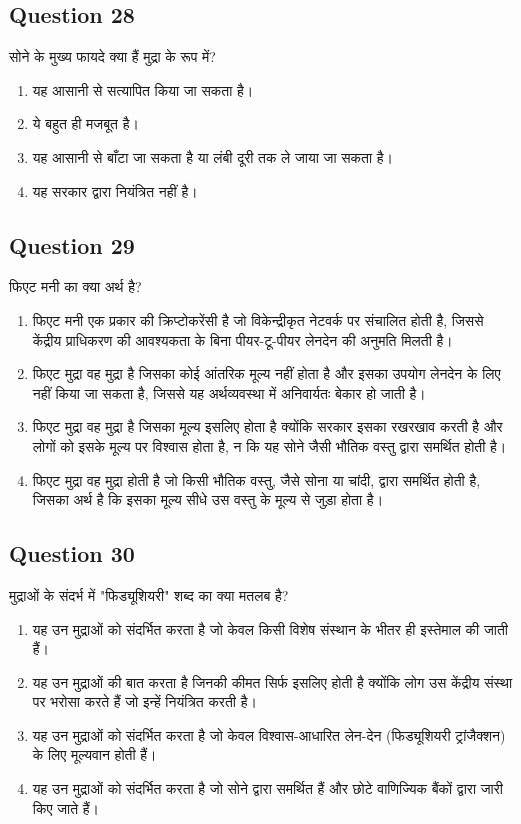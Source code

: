 \documentclass[12pt,a4paper]{article}
\begin{document}
\bigskip


\subsection*{Question 28}
सोने के मुख्य फायदे क्या हैं मुद्रा के रूप में?

\begin{enumerate}[label=\Alph*., leftmargin=*]
\item यह आसानी से सत्यापित किया जा सकता है।
\item ये बहुत ही मजबूत है।
\item यह आसानी से बाँटा जा सकता है या लंबी दूरी तक ले जाया जा सकता है।
\item यह सरकार द्वारा नियंत्रित नहीं है।
\end{enumerate}

\bigskip


\subsection*{Question 29}
फिएट मनी का क्या अर्थ है?

\begin{enumerate}[label=\Alph*., leftmargin=*]
\item फिएट मनी एक प्रकार की क्रिप्टोकरेंसी है जो विकेन्द्रीकृत नेटवर्क पर संचालित होती है, जिससे केंद्रीय प्राधिकरण की आवश्यकता के बिना पीयर-टू-पीयर लेनदेन की अनुमति मिलती है।
\item फिएट मुद्रा वह मुद्रा है जिसका कोई आंतरिक मूल्य नहीं होता है और इसका उपयोग लेनदेन के लिए नहीं किया जा सकता है, जिससे यह अर्थव्यवस्था में अनिवार्यतः बेकार हो जाती है।
\item फिएट मुद्रा वह मुद्रा है जिसका मूल्य इसलिए होता है क्योंकि सरकार इसका रखरखाव करती है और लोगों को इसके मूल्य पर विश्वास होता है, न कि यह सोने जैसी भौतिक वस्तु द्वारा समर्थित होती है।
\item फिएट मुद्रा वह मुद्रा होती है जो किसी भौतिक वस्तु, जैसे सोना या चांदी, द्वारा समर्थित होती है, जिसका अर्थ है कि इसका मूल्य सीधे उस वस्तु के मूल्य से जुड़ा होता है।
\end{enumerate}

\bigskip


\subsection*{Question 30}
मुद्राओं के संदर्भ में "फिड्यूशियरी" शब्द का क्या मतलब है?

\begin{enumerate}[label=\Alph*., leftmargin=*]
\item यह उन मुद्राओं को संदर्भित करता है जो केवल किसी विशेष संस्थान के भीतर ही इस्तेमाल की जाती हैं।
\item यह उन मुद्राओं की बात करता है जिनकी कीमत सिर्फ इसलिए होती है क्योंकि लोग उस केंद्रीय संस्था पर भरोसा करते हैं जो इन्हें नियंत्रित करती है।
\item यह उन मुद्राओं को संदर्भित करता है जो केवल विश्वास-आधारित लेन-देन (फिड्यूशियरी ट्रांजैक्शन) के लिए मूल्यवान होती हैं।
\item यह उन मुद्राओं को संदर्भित करता है जो सोने द्वारा समर्थित हैं और छोटे वाणिज्यिक बैंकों द्वारा जारी किए जाते हैं।
\end{enumerate}
\end{document}
